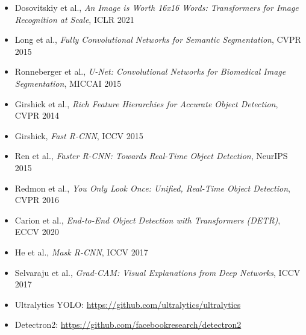 \documentclass[a4paper]{article}
\begin{document}
\begin{itemize}
    \item Dosovitskiy et al., \textit{An Image is Worth 16x16 Words: Transformers for Image Recognition at Scale}, ICLR 2021
    \item Long et al., \textit{Fully Convolutional Networks for Semantic Segmentation}, CVPR 2015
    \item Ronneberger et al., \textit{U-Net: Convolutional Networks for Biomedical Image Segmentation}, MICCAI 2015
    \item Girshick et al., \textit{Rich Feature Hierarchies for Accurate Object Detection}, CVPR 2014
    \item Girshick, \textit{Fast R-CNN}, ICCV 2015
    \item Ren et al., \textit{Faster R-CNN: Towards Real-Time Object Detection}, NeurIPS 2015
    \item Redmon et al., \textit{You Only Look Once: Unified, Real-Time Object Detection}, CVPR 2016
    \item Carion et al., \textit{End-to-End Object Detection with Transformers (DETR)}, ECCV 2020
    \item He et al., \textit{Mask R-CNN}, ICCV 2017
    \item Selvaraju et al., \textit{Grad-CAM: Visual Explanations from Deep Networks}, ICCV 2017
    \item Ultralytics YOLO: \url{https://github.com/ultralytics/ultralytics}
    \item Detectron2: \url{https://github.com/facebookresearch/detectron2}
\end{itemize}
\end{document}
